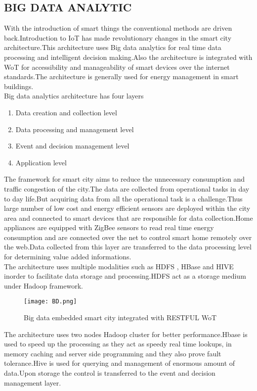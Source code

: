 \documentclass[10pt,a4paper,journal]{IEEEtran}
\begin{document}
\subsection{BIG DATA ANALYTIC}
\hspace{2em}With the introduction of smart things the conventional methods are driven back.Introduction to IoT has made revolutionary changes in the smart city architecture.This architecture uses Big data analytics for real time data processing and intelligent decision making.Also the architecture is integrated with WoT for accessibility  and manageability of smart devices over the internet standards.The architecture is generally used for energy management in smart buildings.\\
\hspace{2em}Big data analytics architecture\cite{9} has four layers 
\begin{enumerate}
\item Data creation and collection level
\item Data processing and management level
\item Event and decision management level
\item Application level
\end{enumerate}
\hspace{2em}The framework for smart city aims to reduce the unnecessary consumption and traffic congestion of the city.The data are collected from operational tasks in day to day life.But  acquiring data from all the operational task is a challenge.Thus large number of low cost and energy efficient sensors are deployed within the city area and connected to smart devices that are responsible for data collection.Home appliances are equipped with ZigBee sensors to read real time energy consumption and are connected over the net to control smart home remotely over the web.Data collected from this layer are transferred to the data processing level for determining value added informations.\\
\hspace{2em}The architecture uses multiple modalities such as HDFS \cite{10}, HBase and HIVE\cite{11} inorder to facilitate data storage and processing.HDFS act as a storage medium under Hadoop framework.\\
\begin{figure}[htbp]
\centering
\texttt{[image: BD.png]}
\caption{Big data embedded smart city integrated with RESTFUL WoT\cite{9}}
\label{2}
\end{figure}
\hspace{2em}The architecture uses two nodes Hadoop cluster for better performance.Hbase is used to speed up the processing as they act as speedy real time lookups, in memory caching and server side programming and they also prove fault tolerance.Hive is used for querying and management of enormous amount of data.Upon storage the control is transferred to the event and decision management layer.\\
\end{document}
